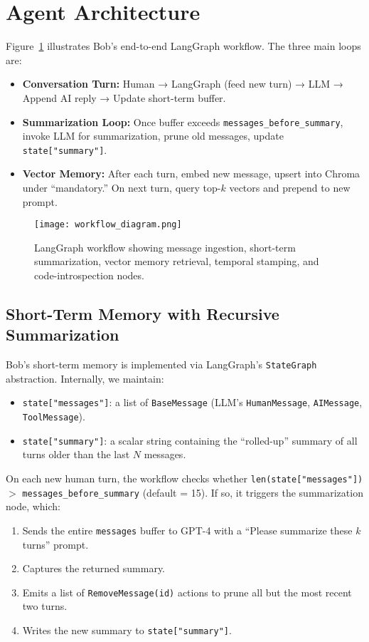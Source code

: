 \documentclass[11pt]{article}
\begin{document}
\section{Agent Architecture}
Figure~\ref{fig:workflow} illustrates Bob’s end-to-end LangGraph workflow. The three main loops are:
\begin{itemize}[leftmargin=*]
  \item \textbf{Conversation Turn:} Human → LangGraph (feed new turn) → LLM → Append AI reply → Update short-term buffer.
  \item \textbf{Summarization Loop:} Once buffer exceeds \texttt{messages\_before\_summary}, invoke LLM for summarization, prune old messages, update \texttt{state["summary"]}.
  \item \textbf{Vector Memory:} After each turn, embed new message, upsert into Chroma under “mandatory.” On next turn, query top-$k$ vectors and prepend to new prompt.
\end{itemize}

\begin{figure}[H]
  \centering
  \texttt{[image: workflow\_diagram.png]}
  \caption{LangGraph workflow showing message ingestion, short-term summarization, vector memory retrieval, temporal stamping, and code-introspection nodes.}
  \label{fig:workflow}
\end{figure}

\subsection{Short-Term Memory with Recursive Summarization}
Bob’s short-term memory is implemented via LangGraph’s \texttt{StateGraph} abstraction. Internally, we maintain:
\begin{itemize}[leftmargin=*]
  \item \texttt{state["messages"]}: a list of \texttt{BaseMessage} (LLM’s \texttt{HumanMessage}, \texttt{AIMessage}, \texttt{ToolMessage}).
  \item \texttt{state["summary"]}: a scalar string containing the “rolled-up” summary of all turns older than the last $N$ messages.
\end{itemize}

On each new human turn, the workflow checks whether \texttt{len(state["messages"])} $>$ \texttt{messages\_before\_summary} (default = 15). If so, it triggers the summarization node, which:
\begin{enumerate}[leftmargin=*]
  \item Sends the entire \texttt{messages} buffer to GPT-4 with a “Please summarize these $k$ turns” prompt.
  \item Captures the returned summary.
  \item Emits a list of \texttt{RemoveMessage(id)} actions to prune all but the most recent two turns.
  \item Writes the new summary to \texttt{state["summary"]}.
\end{enumerate}
\end{document}
